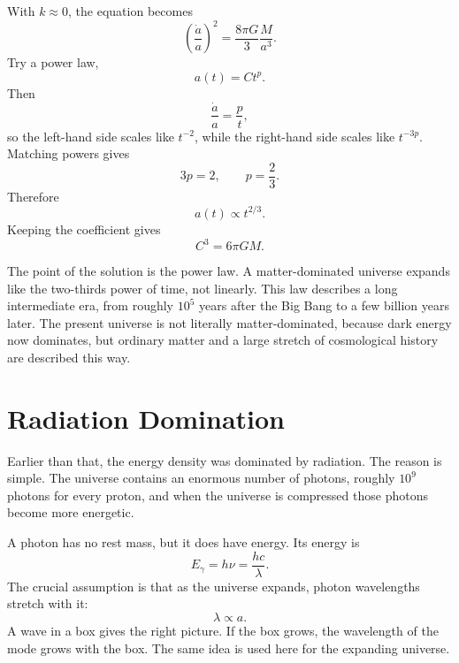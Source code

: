 With \(k\approx 0\), the equation becomes
\begin{equation}
\left(\frac{\dot a}{a}\right)^2=\frac{8\pi G}{3}\frac{M}{a^3}.
\end{equation}
Try a power law,
\begin{equation}
a(t)=Ct^p.
\end{equation}
Then
\begin{equation}
\frac{\dot a}{a}=\frac{p}{t},
\end{equation}
so the left-hand side scales like \(t^{-2}\), while the right-hand side scales like \(t^{-3p}\). Matching powers gives
\begin{equation}
3p=2,
\qquad
p=\frac{2}{3}.
\end{equation}
Therefore
\begin{equation}
a(t)\propto t^{2/3}.
\end{equation}
Keeping the coefficient gives
\begin{equation}
C^3=6\pi G M.
\end{equation}

The point of the solution is the power law. A matter-dominated universe expands like the two-thirds power of time, not linearly. This law describes a long intermediate era, from roughly \(10^5\) years after the Big Bang to a few billion years later. The present universe is not literally matter-dominated, because dark energy now dominates, but ordinary matter and a large stretch of cosmological history are described this way.

\section{Radiation Domination}

Earlier than that, the energy density was dominated by radiation. The reason is simple. The universe contains an enormous number of photons, roughly \(10^9\) photons for every proton, and when the universe is compressed those photons become more energetic.

A photon has no rest mass, but it does have energy. Its energy is
\begin{equation}
E_\gamma=h\nu=\frac{hc}{\lambda}.
\end{equation}
The crucial assumption is that as the universe expands, photon wavelengths stretch with it:
\begin{equation}
\lambda\propto a.
\end{equation}
A wave in a box gives the right picture. If the box grows, the wavelength of the mode grows with the box. The same idea is used here for the expanding universe.

